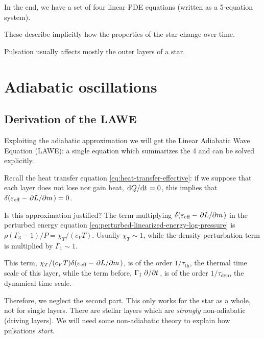 \documentclass[main.tex]{subfiles}
\begin{document}
In the end, we have a set of four linear PDE equations (written as a 5-equation system).

These describe implicitly how the properties of the star change over time.

Pulsation usually affects mostly the outer layers of a star.


\section{Adiabatic oscillations}

\subsection{Derivation of the LAWE}

Exploiting the adiabatic approximation we will get the  Linear Adiabatic Wave Equation (LAWE): a single equation which summarizes the 4 and can be solved explicitly.

Recall the heat transfer equation \eqref{eq:heat-transfer-effective}: 
if we suppose that each layer does not lose nor gain heat, \(\dv*{Q}{t} =0\), this implies that \(\delta (\varepsilon_{\text{eff}} - \pdv*{L}{m} )=0\).

Is this approximation justified? The term multiplying \(\delta (\varepsilon_{\text{eff}} - \pdv*{L}{m} )\) in the perturbed energy equation \eqref{eq:perturbed-linearized-energy-log-pressure} is \(\rho (\Gamma_3-1)/P  = \chi_T / (c_V T)\).
Usually \(\chi_T \sim 1\), while the density perturbation term is multiplied by \(\Gamma_1 \sim 1\).

This term,  \( \chi_T / (c_V T) \delta (\varepsilon_{\text{eff}} - \pdv*{L}{m} )\), is of the order \(1/\tau_{\text{th}}\), the thermal time scale of this layer, while the term before, \(\Gamma_1 \pdv*{}{t} (\delta \rho / \rho)\), is of the order \(1/\tau_{\text{dyn}}\), the dynamical time scale.


Therefore, we neglect the second part.
This only works for the star as a whole, not for single layers.
There are stellar layers which are \emph{strongly} non-adiabatic (driving layers). We will need some non-adiabatic theory to explain how pulsations \emph{start}.
\end{document}
